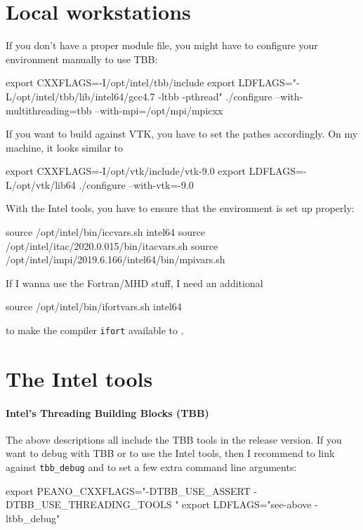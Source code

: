 \section{Local workstations}


If you don't have a proper module file, you might have to configure your environment manually to use TBB:
\begin{code}
 export CXXFLAGS=-I/opt/intel/tbb/include
 export LDFLAGS="-L/opt/intel/tbb/lib/intel64/gcc4.7 -ltbb -pthread"
 ./configure --with-multithreading=tbb --with-mpi=/opt/mpi/mpicxx
\end{code}


If you want to build against VTK, you have to set the pathes accordingly. 
On my machine, it looks similar to
\begin{code}
 export CXXFLAGS=-I/opt/vtk/include/vtk-9.0
 export LDFLAGS=-L/opt/vtk/lib64
 ./configure --with-vtk=-9.0
\end{code}


With the Intel tools, you have to ensure that the environment is set up 
properly:
\begin{code}
source /opt/intel/bin/iccvars.sh intel64
source /opt/intel/itac/2020.0.015/bin/itacvars.sh
source /opt/intel/impi/2019.6.166/intel64/bin/mpivars.sh
\end{code}
\label{label:supercomputer:Intel-scripts}


If I wanna use the Fortran/MHD stuff, I need an additional
\begin{code}
source /opt/intel/bin/ifortvars.sh intel64
\end{code}
to make the compiler \texttt{ifort} available to \Peano.


\section{The Intel tools}
\label{section:supercomputers:IntelTools}

\paragraph{Intel's Threading Building Blocks (TBB)}

The above descriptions all include the TBB tools in the release version.
If you want to debug with TBB or to use the Intel tools, then I recommend to
link against \texttt{tbb\_debug} and to set a few extra command line arguments:

\begin{code}
 export PEANO_CXXFLAGS="-DTBB_USE_ASSERT -DTBB_USE_THREADING_TOOLS "
 export LDFLAGS="see-above   -ltbb_debug"
\end{code}

